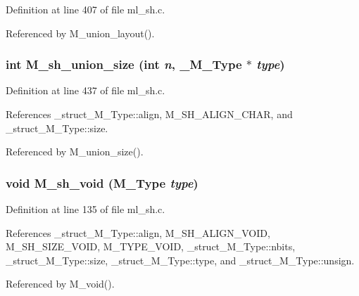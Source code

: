 Definition at line 407 of file ml\_\-sh.c.

Referenced by M\_\-union\_\-layout().
\subsubsection{\setlength{\rightskip}{0pt plus 5cm}int M\_\-sh\_\-union\_\-size (int {\em n}, \bf{\_\-M\_\-Type} $\ast$ {\em type})}\label{m__sh_8h_00a63818df8d75dd91dab35d3507ef13}




Definition at line 437 of file ml\_\-sh.c.

References \_\-struct\_\-M\_\-Type::align, M\_\-SH\_\-ALIGN\_\-CHAR, and \_\-struct\_\-M\_\-Type::size.

Referenced by M\_\-union\_\-size().
\subsubsection{\setlength{\rightskip}{0pt plus 5cm}void M\_\-sh\_\-void (\bf{M\_\-Type} {\em type})}\label{m__sh_8h_5ac022b280bb8009d4c3744963b6951b}




Definition at line 135 of file ml\_\-sh.c.

References \_\-struct\_\-M\_\-Type::align, M\_\-SH\_\-ALIGN\_\-VOID, M\_\-SH\_\-SIZE\_\-VOID, M\_\-TYPE\_\-VOID, \_\-struct\_\-M\_\-Type::nbits, \_\-struct\_\-M\_\-Type::size, \_\-struct\_\-M\_\-Type::type, and \_\-struct\_\-M\_\-Type::unsign.

Referenced by M\_\-void().